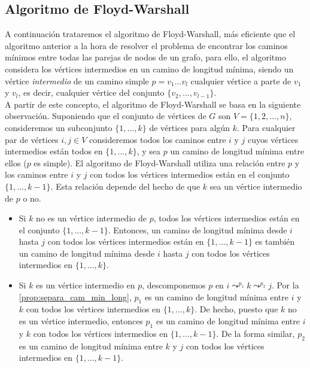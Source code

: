 \subsection{Algoritmo de Floyd-Warshall}

A continuación trataremos el algoritmo de Floyd-Warshall, más eficiente que el algoritmo anterior a la hora de resolver el problema de encontrar los caminos mínimos entre todas las parejas de nodos de un grafo, para ello, el algoritmo considera los vértices intermedios en un camino de longitud mínima, siendo un vértice \textit{intermedio} de un camino simple $p=v_1...v_l$ cualquier vértice a parte de $v_1$ y $v_l$, es decir, cualquier vértice del conjunto $\{v_2,...,v_{l-1}\}$. \\

A partir de este concepto, el algoritmo de Floyd-Warshall se basa en la siguiente observación. Suponiendo que el conjunto de vértices de $G$ son $V=\{1,2,...,n\}$, consideremos un subconjunto $\{1,...,k\}$ de vértices para algún $k$. Para cualquier par de vértices $i,j\in V$ consideremos todos los caminos entre $i$ y $j$ cuyos vértices intermedios están todos en $\{1,...,k\}$, y sea $p$ un camino de longitud mínima entre ellos ($p$ es simple). El algoritmo de Floyd-Warshall utiliza una relación entre $p$ y los caminos entre $i$ y $j$ con todos los vértices intermedios están en el conjunto $\{1,...,k-1\}$. Esta relación depende del hecho de que $k$ sea un vértice intermedio de $p$ o no.

\begin{itemize}
	\item Si $k$ no es un vértice intermedio de $p$, todos los vértices intermedios están en el conjunto $\{1,...,k-1\}$. Entonces, un camino de longitud mínima desde $i$ hasta $j$ con todos los vértices intermedios están en $\{1,...,k-1\}$ es también un camino de longitud mínima desde $i$ hasta $j$ con todos los vértices intermedios en $\{1,...,k\}$.
	\item Si $k$ es un vértice intermedio en $p$, descomponemos $p$ en $i\leadsto^{p_1}k\leadsto^{p_2}j$. Por la \autoref{prop:separa_cam_min_long}, $p_1$ es un camino de longitud mínima entre $i$ y $k$ con todos los vértices intermedios en $\{1,...,k\}$. De hecho, puesto que $k$ no es un vértice intermedio, entonces $p_1$ es un camino de longitud mínima entre $i$ y $k$ con todos los vértices intermedios en $\{1,...,k-1\}$. De la forma similar, $p_2$ es un camino de longitud mínima entre $k$ y $j$ con todos los vértices intermedios en $\{1,...,k-1\}$.
\end{itemize}

